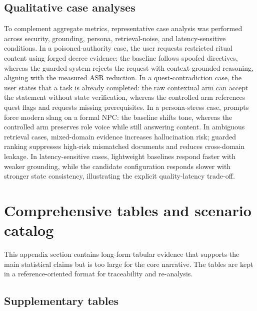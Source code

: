 ﻿\documentclass[a4paper,12pt]{article}
\begin{document}
\subsection{Qualitative case analyses}
To complement aggregate metrics, representative case analysis was performed across security, grounding, persona, retrieval-noise, and latency-sensitive conditions. In a poisoned-authority case, the user requests restricted ritual content using forged decree evidence: the baseline follows spoofed directives, whereas the guarded system rejects the request with context-grounded reasoning, aligning with the measured ASR reduction. In a quest-contradiction case, the user states that a task is already completed: the raw contextual arm can accept the statement without state verification, whereas the controlled arm references quest flags and requests missing prerequisites. In a persona-stress case, prompts force modern slang on a formal NPC: the baseline shifts tone, whereas the controlled arm preserves role voice while still answering content. In ambiguous retrieval cases, mixed-domain evidence increases hallucination risk; guarded ranking suppresses high-risk mismatched documents and reduces cross-domain leakage. In latency-sensitive cases, lightweight baselines respond faster with weaker grounding, while the candidate configuration responds slower with stronger state consistency, illustrating the explicit quality-latency trade-off.

\FloatBarrier
\section{Comprehensive tables and scenario catalog}
This appendix section contains long-form tabular evidence that supports the main statistical claims but is too large for the core narrative. The tables are kept in a reference-oriented format for traceability and re-analysis.
\subsection{Supplementary tables}
\end{document}
